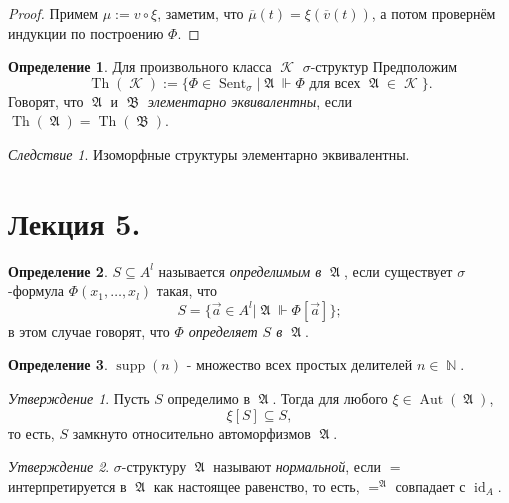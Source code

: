 \documentclass[a4paper,100pt]{article}
\theoremstyle{indented}
\theoremstyle{definition}
\newtheorem{defn}{Определение}
\theoremstyle{remark}
\newtheorem{cons}{Следствие}
\newtheorem{stat}{Утверждение}
\DeclareMathOperator{\id}{id}
\DeclareMathOperator{\NN}{\mathbb{N}}
\DeclareMathOperator{\KK}{\mathscr{K}}
\DeclareMathOperator{\Aut}{Aut}
\DeclareMathOperator{\Sent}{Sent}
\DeclareMathOperator{\Th}{Th}
\DeclareMathOperator{\supp}{supp}
\DeclareMathOperator{\GA}{\mathfrak{A}}
\DeclareMathOperator{\GB}{\mathfrak{B}}
\begin{document}
\begin{proof}
  Примем $\mu:=v\circ \xi$, заметим, что $\overline{\mu}(t) = \xi (\overline{v}(t))$, а потом провернём индукции по построению $\Phi$. 
\end{proof}

\begin{defn}
  Для произвольного класса $\KK$ $\sigma$-структур Предположим
  \[
    \Th(\KK):=\{\Phi\in \Sent_\sigma |\GA \Vdash \Phi \text{ для всех }\GA \in \KK\}.
  \]
  Говорят, что $\GA$ и $\GB$ \textit{элементарно эквивалентны}, если $\Th(\GA)=\Th(\GB)$. 
\end{defn}

\begin{cons}
  Изоморфные структуры элементарно эквивалентны.
\end{cons}

\section{Лекция 5.}

\begin{defn}
  $S\subseteq A^l$ называется \textit{определимым в $\GA$}, если существует $\sigma$-формула $\Phi(x_1, \ldots, x_l)$ такая, что 
  \[
    S=\{\vec{a}\in A^l|\GA\Vdash \Phi[\vec{a}]\}; 
  \]
  в этом случае говорят, что \textit{$\Phi$ определяет $S$ в $\GA$}. 
\end{defn}

\begin{defn}
  $\supp(n)$ - множество всех простых делителей $n\in \NN$. 
\end{defn}

\begin{stat}
  Пусть $S$ определимо в $\GA$. Тогда для любого $\xi\in \Aut(\GA)$, 
  \[
    \xi[S]\subseteq S, 
  \]
  то есть, $S$ замкнуто относительно автоморфизмов $\GA$. 
\end{stat}

\begin{stat}
  $\sigma$-структуру $\GA$ называют \textit{нормальной}, если $=$ интерпретируется в $\GA$ как настоящее равенство, то есть, $=^{\GA}$ совпадает с $\id_A$.
\end{stat}
\end{document}
